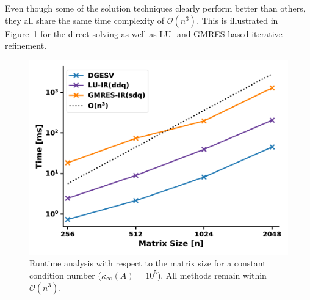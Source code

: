 \noindent Even though some of the solution techniques clearly perform better than others, they all share the same time complexity of $\mathcal{O}(n^3)$. This is illustrated in Figure~\hyperref[fig:ir3_scale]{\ref{fig:ir3_scale}} for the direct solving as well as LU- and GMRES-based iterative refinement. 

\begin{figure}[h]
    \centering
    \includegraphics[width=0.7\linewidth]{chapters/5_experiments/figures/IR3_scaling.pdf}
    \caption[IR - Scaling]{Runtime analysis with respect to the matrix size for a constant condition number ($\kappa_\infty(A)=10^5$). All methods remain within $\mathcal{O}(n^3)$.}
    \label{fig:ir3_scale}
\end{figure}